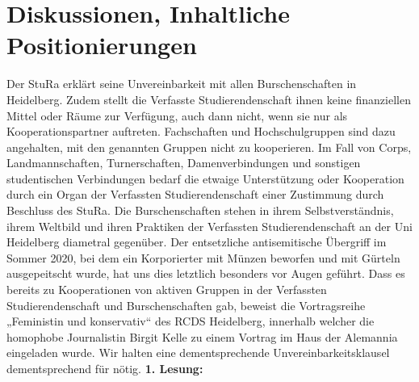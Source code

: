 \section{Diskussionen, Inhaltliche Positionierungen}
{
    Der StuRa erklärt seine Unvereinbarkeit mit allen Burschenschaften in Heidelberg.
    Zudem stellt die Verfasste
    Studierendenschaft ihnen keine finanziellen Mittel oder Räume zur Verfügung, auch
    dann nicht, wenn sie
    nur als Kooperationspartner auftreten. Fachschaften und Hochschulgruppen sind dazu
    angehalten, mit den
    genannten Gruppen nicht zu kooperieren. Im Fall von Corps, Landmannschaften,
    Turnerschaften,
    Damenverbindungen und sonstigen studentischen Verbindungen bedarf die etwaige
    Unterstützung oder
    Kooperation durch ein Organ der Verfassten Studierendenschaft einer Zustimmung durch
    Beschluss des
    StuRa.
}{
    Die Burschenschaften stehen in ihrem Selbstverständnis, ihrem Weltbild und ihren Praktiken der Verfassten Studierendenschaft an der Uni Heidelberg diametral gegenüber. Der entsetzliche antisemitische Übergriff im Sommer 2020, bei dem ein Korporierter mit Münzen beworfen und mit Gürteln ausgepeitscht wurde, hat uns dies letztlich besonders vor Augen geführt. Dass es bereits zu Kooperationen von aktiven Gruppen in der Verfassten Studierendenschaft und Burschenschaften gab, beweist die Vortragsreihe „Feministin und konservativ“ des RCDS Heidelberg, innerhalb welcher die homophobe Journalistin Birgit Kelle zu einem Vortrag im Haus der Alemannia eingeladen wurde. Wir halten eine dementsprechende Unvereinbarkeitsklausel dementsprechend für nötig. 
}{
    \textbf{1. Lesung:}
    \ul{
		}}
